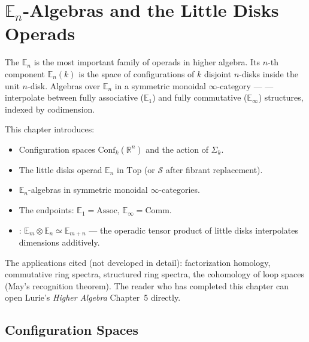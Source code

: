 
\chapter{$\mathbb{E}_n$-Algebras and the Little Disks Operads}

\begin{overviewbox}
The  $\mathbb{E}_n$ is the most important
family of operads in higher algebra. Its $n$-th component
$\mathbb{E}_n(k)$ is the space of configurations of $k$ disjoint
$n$-disks inside the unit $n$-disk. Algebras over $\mathbb{E}_n$ in a
symmetric monoidal $\infty$-category —  —
interpolate between fully associative ($\mathbb{E}_1$) and fully
commutative ($\mathbb{E}_\infty$) structures, indexed by codimension.

This chapter introduces:
\begin{itemize}
  \item Configuration spaces $\mathrm{Conf}_k(\mathbb{R}^n)$ and the
        action of $\Sigma_k$.
  \item The little disks operad $\mathbb{E}_n$ in $\mathrm{Top}$ (or
        $\mathcal{S}$ after fibrant replacement).
  \item $\mathbb{E}_n$-algebras in symmetric monoidal $\infty$-categories.
  \item The endpoints: $\mathbb{E}_1 = \mathrm{Assoc}$, $\mathbb{E}_\infty = \mathrm{Comm}$.
  \item {}: $\mathbb{E}_m \otimes \mathbb{E}_n \simeq
        \mathbb{E}_{m+n}$ — the operadic tensor product of little disks
        interpolates dimensions additively.
\end{itemize}

The applications cited (not developed in detail): factorization homology,
commutative ring spectra, structured ring spectra, the cohomology of
loop spaces (May's recognition theorem). The reader who has completed
this chapter can open Lurie's \emph{Higher Algebra} Chapter~5 directly.
\end{overviewbox}


\section{Configuration Spaces}
\label{sec:configurations}

